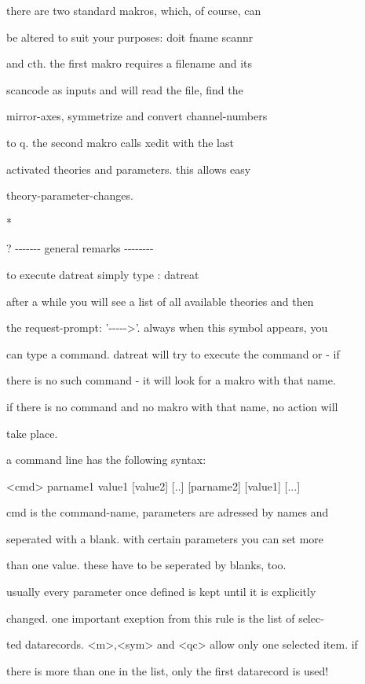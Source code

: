 \documentclass[]{article}
\begin{document}
there are two standard makros, which, of course, can

be altered to suit your purposes: doit fname scannr

and cth. the first makro requires a filename and its

scancode as inputs and will read the file, find the

mirror-axes, symmetrize and convert channel-numbers

to q. the second makro calls xedit with the last

activated theories and parameters. this allows easy

theory-parameter-changes.

*

? -\/-\/-\/-\/-\/-\/- general remarks -\/-\/-\/-\/-\/-\/-\/-

to execute datreat simply type : datreat

after a while you will see a list of all available theories and then

the request-prompt: '-\/-\/-\/-\/-\textgreater{}'. always when this
symbol appears, you

can type a command. datreat will try to execute the command or - if

there is no such command - it will look for a makro with that name.

if there is no command and no makro with that name, no action will

take place.

a command line has the following syntax:

\textless{}cmd\textgreater{} parname1 value1 {[}value2{]} {[}..{]}
{[}parname2{]} {[}value1{]} {[}...{]}

cmd is the command-name, parameters are adressed by names and

seperated with a blank. with certain parameters you can set more

than one value. these have to be seperated by blanks, too.

usually every parameter once defined is kept until it is explicitly

changed. one important exeption from this rule is the list of selec-

ted datarecords. \textless{}m\textgreater{},\textless{}sym\textgreater{}
and \textless{}qc\textgreater{} allow only one selected item. if

there is more than one in the list, only the first datarecord is used!
\end{document}
